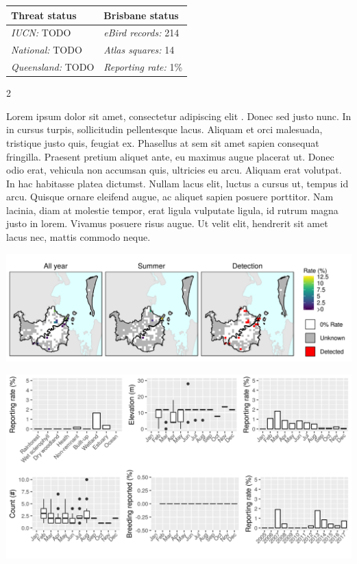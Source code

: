 \documentclass[12pt,openany,oneside]{book}
\let\origfigure\figure
\let\endorigfigure\endfigure
\renewenvironment{figure}[1][2] {
  \expandafter\origfigure\expandafter[H]
} {
  \endorigfigure
}
\let\Begin\begin
\let\End\end
\theoremstyle{definition}
\theoremstyle{definition}
\theoremstyle{definition}
\theoremstyle{remark}
\begin{document}
\begin{tabu} to 
\toprule
Threat status & Brisbane status\\
\midrule
\textit{IUCN:} TODO & \textit{eBird records:} 214\\
\textit{National:} TODO & \textit{Atlas squares:} 14\\
\textit{Queensland:} TODO & \textit{Reporting rate:} 1\%\\
\bottomrule
\end{tabu} 
\vspace{0.15cm}

\Begin{multicols}{2}

Lorem ipsum dolor sit amet, consectetur adipiscing elit
\citep{rexample1, rexample2, rexample3}. Donec sed justo nunc. In in
cursus turpis, sollicitudin pellentesque lacus. Aliquam et orci
malesuada, tristique justo quis, feugiat ex. Phasellus at sem sit amet
sapien consequat fringilla. Praesent pretium aliquet ante, eu maximus
augue placerat ut. Donec odio erat, vehicula non accumsan quis,
ultricies eu arcu. Aliquam erat volutpat. In hac habitasse platea
dictumst. Nullam lacus elit, luctus a cursus ut, tempus id arcu. Quisque
ornare eleifend augue, ac aliquet sapien posuere porttitor. Nam lacinia,
diam at molestie tempor, erat ligula vulputate ligula, id rutrum magna
justo in lorem. Vivamus posuere risus augue. Ut velit elit, hendrerit
sit amet lacus nec, mattis commodo neque.

\End{multicols}

\clearpage

\begin{figure}
\centering
\includegraphics[height=0.47\textheight,width=\textwidth,keepaspectratio=true]{assets/maps/Spatula-rhynchotis.png}
\end{figure}

\begin{figure}
\centering
\includegraphics[height=0.47\textheight,width=\textwidth,keepaspectratio=true]{assets/graphs/Spatula-rhynchotis.png}
\end{figure}
\end{document}
